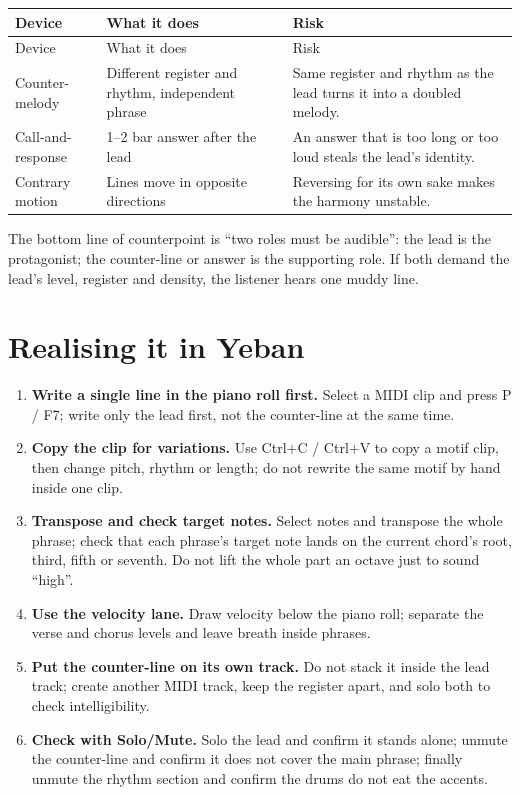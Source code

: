 \begin{longtable}{p{}p{}p{}}
\toprule
Device & What it does & Risk \\
\midrule
\endfirsthead
\toprule
Device & What it does & Risk \\
\midrule
\endhead
Counter-melody & Different register and rhythm, independent phrase & Same register and rhythm as the lead turns it into a doubled melody. \\
Call-and-response & 1--2 bar answer after the lead & An answer that is too long or too loud steals the lead's identity. \\
Contrary motion & Lines move in opposite directions & Reversing for its own sake makes the harmony unstable. \\
\bottomrule
\end{longtable}

The bottom line of counterpoint is ``two roles must be audible'': the lead is the protagonist; the counter-line or answer is the supporting role. If both demand the lead's level, register and density, the listener hears one muddy line.

\section{Realising it in Yeban}
\label{sec:melody-yeban}

\begin{enumerate}
\item \textbf{Write a single line in the piano roll first.} Select a MIDI clip and press P / F7; write only the lead first, not the counter-line at the same time.
\item \textbf{Copy the clip for variations.} Use Ctrl+C / Ctrl+V to copy a motif clip, then change pitch, rhythm or length; do not rewrite the same motif by hand inside one clip.
\item \textbf{Transpose and check target notes.} Select notes and transpose the whole phrase; check that each phrase's target note lands on the current chord's root, third, fifth or seventh. Do not lift the whole part an octave just to sound ``high''.
\item \textbf{Use the velocity lane.} Draw velocity below the piano roll; separate the verse and chorus levels and leave breath inside phrases.
\item \textbf{Put the counter-line on its own track.} Do not stack it inside the lead track; create another MIDI track, keep the register apart, and solo both to check intelligibility.
\item \textbf{Check with Solo/Mute.} Solo the lead and confirm it stands alone; unmute the counter-line and confirm it does not cover the main phrase; finally unmute the rhythm section and confirm the drums do not eat the accents.
\end{enumerate}

